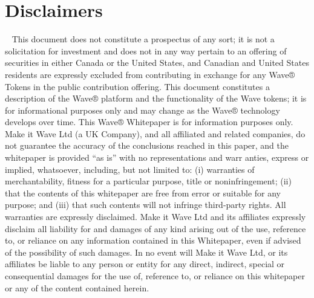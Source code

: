 \documentclass[letterpaper,10pt,openany,oneside,english]{sphinxmanual}
\begin{document}
\section{Disclaimers}
\label{\detokenize{index:disclaimers}}
  This document does not constitute a prospectus of any sort; it is not a solicitation for investment and does not in any way pertain to an offering of securities in either Canada or the United States, and Canadian and United States residents are expressly excluded from contributing in exchange for any Wave® Tokens in the public contribution offering. This document constitutes a description of the Wave® platform and the functionality of the Wave tokens; it is for informational purposes only and may change as the Wave® technology develops over time. This Wave® Whitepaper is for information purposes only. Make it Wave Ltd (a UK Company), and all affiliated and related companies, do not guarantee the accuracy of the conclusions reached in this paper, and the whitepaper is provided “as is” with no representations and warr anties, express or implied, whatsoever, including, but not limited to: (i) warranties of merchantability, fitness for a particular purpose, title or noninfringement; (ii) that the contents of this whitepaper are free from error or suitable for any purpose; and (iii) that such contents will not infringe third-party rights. All warranties are expressly disclaimed. Make it Wave Ltd and its affiliates expressly disclaim all liability for and damages of any kind arising out of the use, reference to, or reliance on any information contained in this Whitepaper, even if advised of the possibility of such damages. In no event will Make it Wave Ltd, or its affiliates be liable to any person or entity for any direct, indirect, special or consequential damages for the use of, reference to, or reliance on this whitepaper or any of the content contained herein.
\end{document}
